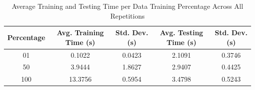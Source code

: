 \begin{table}[h]
\centering
\caption{Average Training and Testing Time per Data Training Percentage Across All Repetitions}
\begin{tabular}{c|cc|cc}
\toprule
Percentage & Avg. Training Time (s) & Std. Dev. (s) & Avg. Testing Time (s) & Std. Dev. (s) \\
\midrule
01 & 0.1022 & 0.0423 & 2.1091 & 0.3746 \\
50 & 3.9444 & 1.8627 & 2.9407 & 0.4425 \\
100 & 13.3756 & 0.5954 & 3.4798 & 0.5243 \\
\bottomrule
\end{tabular}
\end{table}
